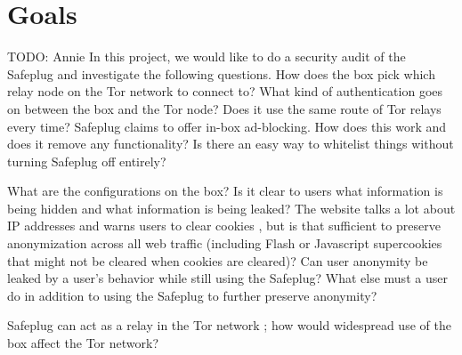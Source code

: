 \section{Goals}
\label{sec:goals}
TODO: Annie
In this project, we would like to do a security audit of the Safeplug and investigate the following questions.  How does the box pick which relay node on the Tor network to connect to?  What kind of authentication goes on between the box and the Tor node?  Does it use the same route of Tor relays every time?
Safeplug claims to offer in-box ad-blocking.  How does this work and does it remove any functionality?  Is there an easy way to whitelist things without turning Safeplug off entirely?

What are the configurations on the box?  Is it clear to users what information is being hidden and what information is being leaked?  The website talks a lot about IP addresses and warns users to clear cookies \cite{safeplug}, but is that sufficient to preserve anonymization across all web traffic (including Flash or Javascript supercookies that might not be cleared when cookies are cleared)?  Can user anonymity be leaked by a user’s behavior while still using the Safeplug?  What else must a user do in addition to using the Safeplug to further preserve anonymity?

Safeplug can act as a relay in the Tor network \cite{techreview}; how would widespread use of the box affect the Tor network?

